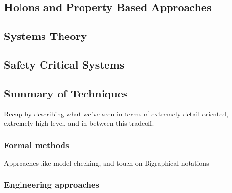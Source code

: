 \subsection{Holons and Property Based Approaches}



\subsection{Systems Theory}


\subsection{Safety Critical Systems}


\subsection{Summary of Techniques}
Recap by describing what we've seen in terms of extremely detail-oriented, extremely high-level, and in-between this tradeoff.
  
\subsubsection{Formal methods}\label{sec:review-formal-methods}

Approaches like model checking, and touch on Bigraphical notations
\par

\subsubsection{Engineering approaches}

